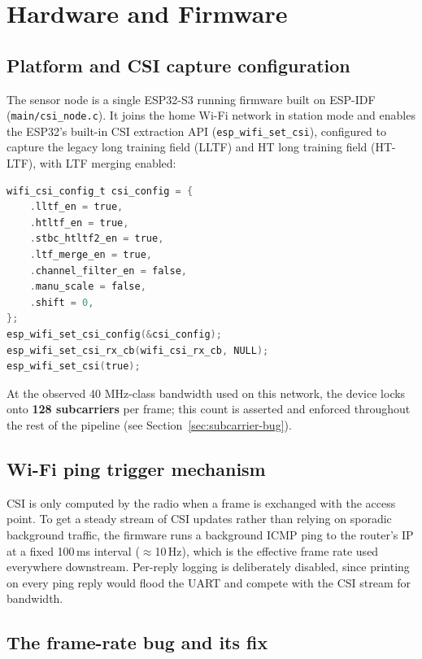 \documentclass[11pt,a4paper]{article}
\begin{document}
\section{Hardware and Firmware}

\subsection{Platform and CSI capture configuration}

The sensor node is a single ESP32-S3 running firmware built on ESP-IDF
(\texttt{main/csi\_node.c}). It joins the home Wi-Fi network in station
mode and enables the ESP32's built-in CSI extraction API
(\texttt{esp\_wifi\_set\_csi}), configured to capture the legacy long
training field (LLTF) and HT long training field (HT-LTF), with LTF
merging enabled:

\begin{lstlisting}[language=C, caption={CSI configuration (main/csi\_node.c)}]
wifi_csi_config_t csi_config = {
    .lltf_en = true,
    .htltf_en = true,
    .stbc_htltf2_en = true,
    .ltf_merge_en = true,
    .channel_filter_en = false,
    .manu_scale = false,
    .shift = 0,
};
esp_wifi_set_csi_config(&csi_config);
esp_wifi_set_csi_rx_cb(wifi_csi_rx_cb, NULL);
esp_wifi_set_csi(true);
\end{lstlisting}

At the observed 40 MHz-class bandwidth used on this network, the device
locks onto \textbf{128 subcarriers} per frame; this count is asserted
and enforced throughout the rest of the pipeline (see
Section~\ref{sec:subcarrier-bug}).

\subsection{Wi-Fi ping trigger mechanism}

CSI is only computed by the radio when a frame is exchanged with the
access point. To get a steady stream of CSI updates rather than relying
on sporadic background traffic, the firmware runs a background ICMP ping
to the router's IP at a fixed 100\,ms interval (\(\approx\)10\,Hz),
which is the effective frame rate used everywhere downstream. Per-reply
logging is deliberately disabled, since printing on every ping reply
would flood the UART and compete with the CSI stream for bandwidth.

\subsection{The frame-rate bug and its fix}
\end{document}
